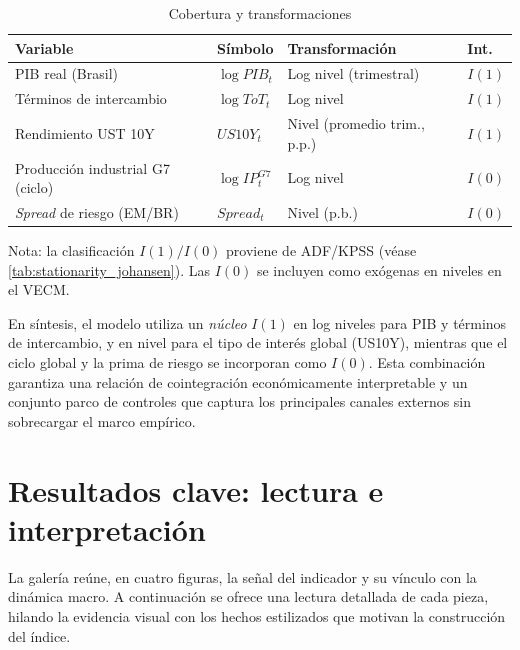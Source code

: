\documentclass[11pt,a4paper]{article}
\numberwithin{equation}{section}
\begin{document}
\begin{table}[t]
\centering
\small
\begin{threeparttable}
\caption{Cobertura y transformaciones}
\label{tab:datos_cobertura}
\begin{tabular}{@{}p{3.8cm} p{2.6cm} p{4.6cm} p{1.6cm}@{}}
\toprule
\textbf{Variable} & \textbf{Símbolo} & \textbf{Transformación} & \textbf{Int.} \\
\midrule
PIB real (Brasil)                 & $\log PIB_t$     & Log nivel (trimestral)                 & $I(1)$ \\
Términos de intercambio           & $\log ToT_t$     & Log nivel                              & $I(1)$ \\
Rendimiento UST 10Y               & $US10Y_t$        & Nivel (promedio trim., p.p.)           & $I(1)$ \\
Producción industrial G7 (ciclo)  & $\log IP^{G7}_t$ & Log nivel                              & $I(0)$ \\
\emph{Spread} de riesgo (EM/BR)   & $Spread_t$       & Nivel (p.b.)                            & $I(0)$ \\
\bottomrule
\end{tabular}
\begin{tablenotes}\footnotesize
\item Nota: la clasificación $I(1)/I(0)$ proviene de ADF/KPSS (véase \cref{tab:stationarity_johansen}). Las $I(0)$ se incluyen como exógenas en niveles en el VECM.
\end{tablenotes}
\end{threeparttable}
\end{table}


En síntesis, el modelo utiliza un \emph{núcleo} $I(1)$ en log niveles para PIB y términos de intercambio, y en nivel para el tipo de interés global (US10Y), mientras que el ciclo global y la prima de riesgo se incorporan como $I(0)$. Esta combinación garantiza una relación de cointegración económicamente interpretable y un conjunto parco de controles que captura los principales canales externos sin sobrecargar el marco empírico.

\section{Resultados clave: lectura e interpretación}

La galería  reúne, en cuatro figuras, la señal del indicador y su vínculo con la dinámica macro. A continuación se ofrece una lectura detallada de cada pieza, hilando la evidencia visual con los hechos estilizados que motivan la construcción del índice.
\end{document}

